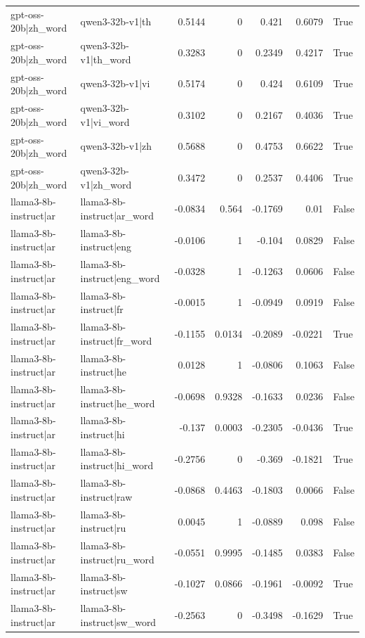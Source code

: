 \begin{table}
\begin{tabular}{l l r r r r l}
gpt-oss-20b|zh_word & qwen3-32b-v1|th & 0.5144 & 0 & 0.421 & 0.6079 & True \\
gpt-oss-20b|zh_word & qwen3-32b-v1|th_word & 0.3283 & 0 & 0.2349 & 0.4217 & True \\
gpt-oss-20b|zh_word & qwen3-32b-v1|vi & 0.5174 & 0 & 0.424 & 0.6109 & True \\
gpt-oss-20b|zh_word & qwen3-32b-v1|vi_word & 0.3102 & 0 & 0.2167 & 0.4036 & True \\
gpt-oss-20b|zh_word & qwen3-32b-v1|zh & 0.5688 & 0 & 0.4753 & 0.6622 & True \\
gpt-oss-20b|zh_word & qwen3-32b-v1|zh_word & 0.3472 & 0 & 0.2537 & 0.4406 & True \\
llama3-8b-instruct|ar & llama3-8b-instruct|ar_word & -0.0834 & 0.564 & -0.1769 & 0.01 & False \\
llama3-8b-instruct|ar & llama3-8b-instruct|eng & -0.0106 & 1 & -0.104 & 0.0829 & False \\
llama3-8b-instruct|ar & llama3-8b-instruct|eng_word & -0.0328 & 1 & -0.1263 & 0.0606 & False \\
llama3-8b-instruct|ar & llama3-8b-instruct|fr & -0.0015 & 1 & -0.0949 & 0.0919 & False \\
llama3-8b-instruct|ar & llama3-8b-instruct|fr_word & -0.1155 & 0.0134 & -0.2089 & -0.0221 & True \\
llama3-8b-instruct|ar & llama3-8b-instruct|he & 0.0128 & 1 & -0.0806 & 0.1063 & False \\
llama3-8b-instruct|ar & llama3-8b-instruct|he_word & -0.0698 & 0.9328 & -0.1633 & 0.0236 & False \\
llama3-8b-instruct|ar & llama3-8b-instruct|hi & -0.137 & 0.0003 & -0.2305 & -0.0436 & True \\
llama3-8b-instruct|ar & llama3-8b-instruct|hi_word & -0.2756 & 0 & -0.369 & -0.1821 & True \\
llama3-8b-instruct|ar & llama3-8b-instruct|raw & -0.0868 & 0.4463 & -0.1803 & 0.0066 & False \\
llama3-8b-instruct|ar & llama3-8b-instruct|ru & 0.0045 & 1 & -0.0889 & 0.098 & False \\
llama3-8b-instruct|ar & llama3-8b-instruct|ru_word & -0.0551 & 0.9995 & -0.1485 & 0.0383 & False \\
llama3-8b-instruct|ar & llama3-8b-instruct|sw & -0.1027 & 0.0866 & -0.1961 & -0.0092 & True \\
llama3-8b-instruct|ar & llama3-8b-instruct|sw_word & -0.2563 & 0 & -0.3498 & -0.1629 & True \\

\end{tabular}
\end{table}

